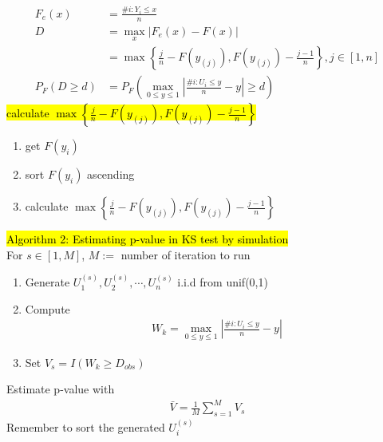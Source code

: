 \documentclass[a4paper,12pt,landscape]{article}
\begin{document}
\begin{multicols}{3}
    \begin{align*}
        F_e(x) &= \frac{\#i: Y_i\leq x}{n}\\
        D &= \max_x |F_e(x) - F(x)|\\
          &=\max\left\{ \frac{j}{n} - F(y_{(j)}), F(y_{(j)}) - \frac{j-1}{n}  \right\}, j \in[1, n]\\
        P_F(D\geq d) &=P_F\left( \max_{0\leq y \leq 1}|\frac{\#i:U_i \leq y}{n} - y| \geq d  \right)
    \end{align*}
    \hl{calculate $\max\left\{ \frac{j}{n} - F(y_{(j)}), F(y_{(j)}) - \frac{j-1}{n}  \right\}$}

    \begin{enumerate}
        \item get $F(y_i)$
        \item sort $F(y_i)$ ascending
        \item calculate $\max\left\{ \frac{j}{n} - F(y_{(j)}), F(y_{(j)}) - \frac{j-1}{n}  \right\}$
    \end{enumerate}

    \hl{Algorithm 2: Estimating p-value in KS test by simulation}\\
    For $s \in [1, M]$, $M:=$ number of iteration to run
    \begin{enumerate}
        \item Generate $U_1^{(s)}, U_2^{(s)}, \cdots, U_n^{(s)}$ i.i.d from unif(0,1)
        \item Compute \begin{align*}
                W_k = \max_{0\leq y \leq 1}|\frac{\#i:U_i \leq y}{n}-y|
            \end{align*}
        \item Set $V_s = I(W_k \geq D_{obs})$
    \end{enumerate}
    Estimate p-value with
    \begin{align*}
        \bar V = \frac{1}{M}\sum_{s=1}^M V_s
    \end{align*}
    Remember to sort the generated $U_i^{(s)}$


\end{multicols}
\end{document}

